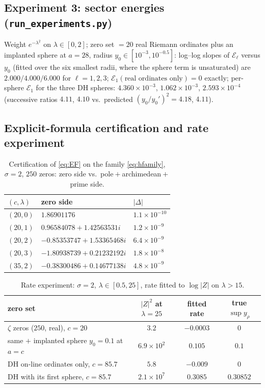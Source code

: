\documentclass[11pt]{amsart}
\theoremstyle{plain}
\theoremstyle{definition}
\theoremstyle{remark}
\newcommand{\EE}{\mathcal{E}}
\begin{document}
\subsection{Experiment 3: sector energies (\texttt{run\_experiments.py})}
Weight $e^{-\lambda^2}$ on $\lambda\in[0,2]$; zero set $=20$ real Riemann ordinates plus an
implanted sphere at $a=28$, radius $y_0\in[10^{-3},10^{-0.5}]$: log--log slopes of $\EE_\ell$
versus $y_0$ (fitted over the six smallest radii, where the sphere term is unsaturated) are
$2.000/4.000/6.000$ for $\ell=1,2,3$; $\EE_1(\text{real ordinates only})=0$
exactly; per-sphere $\EE_1$ for the three DH spheres:
$4.360\times10^{-3}$, $1.062\times10^{-3}$, $2.593\times10^{-4}$ (successive ratios $4.11$,
$4.10$ vs.\ predicted $(y_0/y_0')^2=4.18$, $4.11$).

\subsection{Explicit-formula certification and rate experiment}
\begin{table}[h]
\centering
\caption{Certification of \eqref{eq:EF} on the family \eqref{eq:hfamily}, $\sigma=2$, $250$
zeros: zero side vs.\ pole${}+{}$archimedean${}+{}$prime side.}\label{tab:EF}
\begin{tabular}{lll}
\hline
$(c,\lambda)$ & zero side & $|\Delta|$ \\
\hline
$(20,0)$ & $1.86901176$ & $1.1\times10^{-10}$\\
$(20,1)$ & $0.96584078+1.42563531i$ & $1.2\times10^{-9}$\\
$(20,2)$ & $-0.85353747+1.53365468i$ & $6.4\times10^{-9}$\\
$(20,3)$ & $-1.80938739+0.21232192i$ & $1.8\times10^{-8}$\\
$(35,2)$ & $-0.38300486+0.14677138i$ & $4.8\times10^{-9}$\\
\hline
\end{tabular}
\end{table}

\begin{table}[h]
\centering
\caption{Rate experiment: $\sigma=2$, $\lambda\in[0.5,25]$, rate fitted to
$\log|Z|$ on $\lambda>15$.}\label{tab:rate}
\begin{tabular}{lccc}
\hline
zero set & $|Z|^2$ at $\lambda=25$ & fitted rate & true $\sup y_\rho$ \\
\hline
$\zeta$ zeros ($250$, real), $c=20$ & $3.2$ & $-0.0003$ & $0$\\
same $+$ implanted sphere $y_0=0.1$ at $a=c$ & $6.9\times10^2$ & $0.105$ & $0.1$\\
DH on-line ordinates only, $c=85.7$ & $5.8$ & $-0.009$ & $0$\\
DH with its first sphere, $c=85.7$ & $2.1\times10^7$ & $\mathbf{0.3085}$ & $\mathbf{0.30852}$\\
\hline
\end{tabular}
\end{table}
\end{document}
